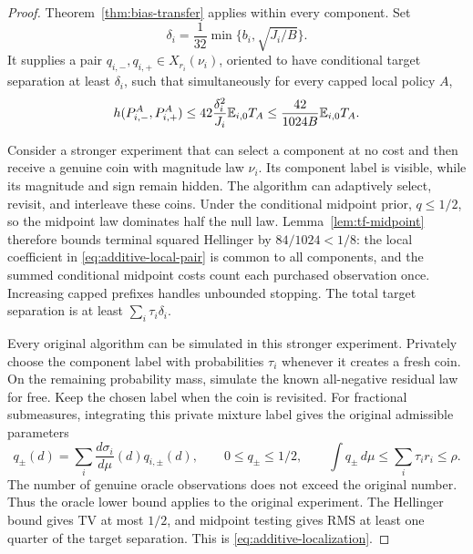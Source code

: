 \begin{proof}
Theorem~\ref{thm:bias-transfer} applies within every component. Set
\[
 \delta_i=\frac1{32}\min\{b_i,\sqrt{J_i/B}\}.
\]
It supplies a pair $q_{i,-},q_{i,+}\in X_{r_i}(\nu_i)$, oriented to have
conditional target separation at least $\delta_i$, such that simultaneously
for every capped local policy $A$,
\begin{equation}\label{eq:additive-local-pair}
 h(P_{i,-}^A,P_{i,+}^A)
 \le42\frac{\delta_i^2}{J_i}\mathbb E_{i,0}T_A
 \le\frac{42}{1024B}\mathbb E_{i,0}T_A.
\end{equation}

Consider a stronger experiment that can select a component at no cost and
then receive a genuine coin with magnitude law $\nu_i$. Its component label
is visible, while its magnitude and sign remain hidden. The algorithm can
adaptively select, revisit, and interleave these coins. Under the conditional
midpoint prior, $q\le1/2$, so the midpoint law dominates half the null law.
Lemma~\ref{lem:tf-midpoint} therefore bounds terminal squared
Hellinger by $84/1024<1/8$: the local coefficient in
\eqref{eq:additive-local-pair} is common to all components, and the summed
conditional midpoint costs count each purchased observation once.
Increasing capped prefixes handles unbounded stopping. The total target
separation is at least $\sum_i\tau_i\delta_i$.

Every original algorithm can be simulated in this stronger experiment.
Privately choose the component label with probabilities $\tau_i$ whenever
it creates a fresh coin. On the remaining probability mass, simulate the
known all-negative residual law for free. Keep the chosen label when the
coin is revisited. For fractional submeasures, integrating this private
mixture label gives the original admissible parameters
\[
 q_\pm(d)=\sum_i\frac{d\sigma_i}{d\mu}(d)q_{i,\pm}(d),
 \qquad 0\le q_\pm\le1/2,\qquad
 \int q_\pm\,d\mu\le\sum_i\tau_i r_i\le\rho.
\]
The number of genuine oracle observations does not exceed the original
number. Thus the oracle lower bound applies to the original experiment.
The Hellinger bound gives TV at most $1/2$, and midpoint testing gives RMS
at least one quarter of the target separation. This is
\eqref{eq:additive-localization}.
\end{proof}

